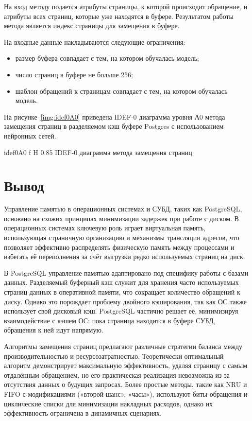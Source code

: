 На вход методу подается атрибуты страницы, к которой происходит обращение, и атрибуты всех страниц, которые уже находятся в буфере.
Результатом работы метода является индекс страницы для замещения в буфере.

На входные данные накладываются следующие ограничения:
\begin{itemize}
	\item размер буфера совпадает с тем, на котором обучалась модель;
	\item число страниц в буфере не больше 256;
	\item шаблон обращений к страницам совпадает с тем, на котором обучалась модель.
\end{itemize}

На рисунке~\ref{img:idef0A0} приведена IDEF-0 диаграмма уровня А0 метода замещения страниц в разделяемом кэш буфере Postgres с использованием нейронных сетей.

{idef0A0} %
{f} %
{H} %
{0.85\textwidth} %
{IDEF-0 диаграмма метода замещения страниц} %

\section{Вывод}
Управление памятью в операционных системах и СУБД, таких как PostgreSQL, основано на схожих принципах минимизации задержек при работе с диском.
В операционных системах ключевую роль играет виртуальная память, использующая страничную организацию и механизмы трансляции адресов, что позволяет эффективно распределять физическую память между процессами и избегать её переполнения за счёт выгрузки редко используемых страниц на диск. 

В PostgreSQL управление памятью адаптировано под специфику работы с базами данных. 
Разделяемый буферный кэш служит для хранения часто используемых страниц данных в оперативной памяти, что сокращает количество обращений к диску.
Однако это порождает проблему двойного кэширования, так как ОС также использует свой дисковый кэш.
PostgreSQL частично решает её, минимизируя взаимодействие с кэшем ОС: пока страница находится в буфере СУБД, обращения к ней идут напрямую.

Алгоритмы замещения страниц предлагают различные стратегии баланса между производительностью и ресурсозатратностью.
Теоретически оптимальный алгоритм демонстрирует максимальную эффективность, удаляя страницу с самым отдалённым обращением, но его практическая реализация невозможна из-за отсутствия данных о будущих запросах. 
Более простые методы, такие как NRU и FIFO с модификациями («второй шанс», «часы»), используют биты обращения и циклические списки для минимизации накладных расходов, однако их эффективность ограничена в динамичных сценариях.

